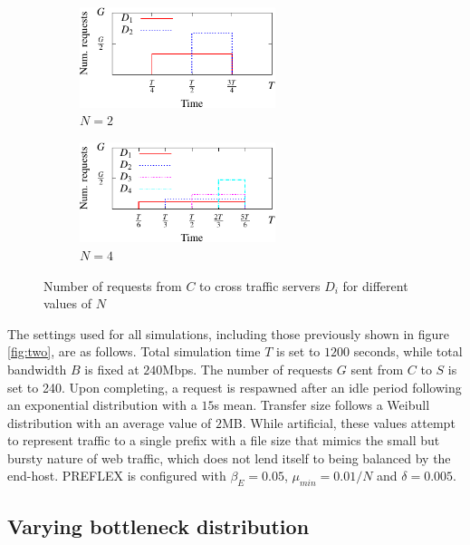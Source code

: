 \begin{figure}
    \begin{subfigure}[b]{.5\linewidth}
        \centering
        \includegraphics[width=2.25in]{figures/cate/dummy2-crop.pdf}
        \caption{$N=2$}\label{fig:1a}
    \end{subfigure}%
    \begin{subfigure}[b]{.5\linewidth}
        \centering
        \includegraphics[width=2.25in]{figures/cate/dummy4-crop.pdf}
        \caption{$N=4$}\label{fig:1b}
    \end{subfigure}
    \caption[Number of requests to cross traffic servers.]{Number of requests from $C$ to cross traffic servers $D_i$ for different values of $N$}
    \label{fig:demand}
\end{figure}

The settings used for all simulations, including those previously shown in figure \ref{fig:two}, are as follows.
Total simulation time $T$ is set to $1200$ seconds, while total bandwidth $B$ is fixed at $240$Mbps. 
The number of requests $G$ sent from $C$ to $S$ is set to 240. 
Upon completing, a request is respawned after an idle period following an exponential distribution with a $15$s mean. 
Transfer size follows a Weibull distribution with an average value of $2$MB. 
While artificial, these values attempt to represent traffic to a single prefix with a file size that mimics the small but bursty nature of web traffic, which does not lend itself to being balanced by the end-host. 
\ac{PREFLEX} is configured with $\beta_E = 0.05$, $\mu_{min}=0.01/N$ and $\delta=0.005$.

\subsection{Varying bottleneck distribution}

